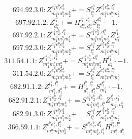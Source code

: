 \documentclass[letterpaper,10pt,fleqn,leqno,onecolumn]{article}
\begin{document}
\begin{equation} \;\;\;\;\;\;  694.92.3.0: Z^{e_{1}^{a}e_{1}^{b}e_{2}^{b}}_{m_{1}^{a}m_{1}^{b}m_{2}^{b}}+=S^{e_{1}^{a}}_{l_{1}^{a}}Z^{e_{1}^{b}e_{2}^{b},l_{1}^{a}}_{m_{1}^{a}m_{1}^{b}m_{2}^{b}} \end{equation}
\begin{equation} \;\;\;\;\;\;  697.92.1.2: Z^{l_{1}^{a}}_{d_{1}^{a}}+=H^{l_{1}^{a},l_{2}^{a}}_{d_{1}^{a},d_{2}^{a}}S^{d_{2}^{a}}_{l_{2}^{a}}\cdot -1. \end{equation}
\begin{equation} \;\;\;\;\;\;  697.92.2.1: Z^{e_{1}^{b}e_{2}^{b},l_{1}^{a}}_{m_{1}^{a}m_{1}^{b}m_{2}^{b}}+=S^{e_{1}^{b}e_{2}^{b},d_{1}^{a}}_{m_{1}^{a}m_{1}^{b}m_{2}^{b}}Z^{l_{1}^{a}}_{d_{1}^{a}} \end{equation}
\begin{equation} \;\;\;\;\;\;  697.92.3.0: Z^{e_{1}^{a}e_{1}^{b}e_{2}^{b}}_{m_{1}^{a}m_{1}^{b}m_{2}^{b}}+=S^{e_{1}^{a}}_{l_{1}^{a}}Z^{e_{1}^{b}e_{2}^{b},l_{1}^{a}}_{m_{1}^{a}m_{1}^{b}m_{2}^{b}} \end{equation}
\begin{equation} \;\;\;\;\;\;  311.54.1.1: Z^{e_{1}^{b}e_{2}^{b},l_{1}^{a}}_{m_{1}^{a}m_{1}^{b}m_{2}^{b}}+=S^{e_{1}^{b}e_{2}^{b},d_{1}^{a}}_{m_{1}^{a}m_{1}^{b}m_{2}^{b}}H^{l_{1}^{a}}_{d_{1}^{a}}\cdot -1. \end{equation}
\begin{equation} \;\;\;\;\;\;  311.54.2.0: Z^{e_{1}^{a}e_{1}^{b}e_{2}^{b}}_{m_{1}^{a}m_{1}^{b}m_{2}^{b}}+=S^{e_{1}^{a}}_{l_{1}^{a}}Z^{e_{1}^{b}e_{2}^{b},l_{1}^{a}}_{m_{1}^{a}m_{1}^{b}m_{2}^{b}} \end{equation}
\begin{equation} \;\;\;\;\;\;  682.91.1.2: Z^{l_{1}^{b},l_{1}^{a}}_{m_{1}^{a},d_{1}^{b}}+=H^{l_{1}^{b},l_{1}^{a}}_{d_{1}^{b},d_{1}^{a}}S^{d_{1}^{a}}_{m_{1}^{a}}\cdot -1. \end{equation}
\begin{equation} \;\;\;\;\;\;  682.91.2.1: Z^{e_{1}^{b}e_{2}^{b},l_{1}^{a}}_{m_{1}^{a}m_{1}^{b}m_{2}^{b}}+=S^{e_{1}^{b}e_{2}^{b},d_{1}^{b}}_{m_{1}^{b}m_{2}^{b},l_{1}^{b}}Z^{l_{1}^{b},l_{1}^{a}}_{m_{1}^{a},d_{1}^{b}} \end{equation}
\begin{equation} \;\;\;\;\;\;  682.91.3.0: Z^{e_{1}^{a}e_{1}^{b}e_{2}^{b}}_{m_{1}^{a}m_{1}^{b}m_{2}^{b}}+=S^{e_{1}^{a}}_{l_{1}^{a}}Z^{e_{1}^{b}e_{2}^{b},l_{1}^{a}}_{m_{1}^{a}m_{1}^{b}m_{2}^{b}} \end{equation}
\begin{equation} \;\;\;\;\;\;  366.59.1.1: Z^{e_{1}^{b}e_{2}^{b},l_{1}^{a}}_{m_{1}^{a}m_{1}^{b}m_{2}^{b}}+=S^{e_{1}^{b}e_{2}^{b},d_{1}^{b}}_{m_{1}^{b}m_{2}^{b},l_{1}^{b}}H^{l_{1}^{b},l_{1}^{a}}_{m_{1}^{a},d_{1}^{b}} \end{equation}
\end{document}
